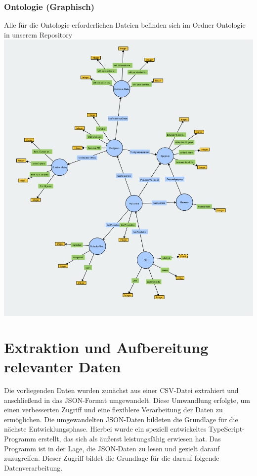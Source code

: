 \documentclass[a4paper, 12pt]{article}
\begin{document}
\subsubsection{Ontologie (Graphisch)}
Alle für die Ontologie erforderlichen Dateien befinden sich im Ordner Ontologie in unserem Repository
\newline
\includegraphics[width=\textwidth]{migration.png}
\newline \newline

\section{Extraktion und Aufbereitung relevanter Daten}
Die vorliegenden Daten wurden zunächst aus einer CSV-Datei extrahiert und anschließend in das JSON-Format umgewandelt. Diese Umwandlung erfolgte, um einen verbesserten Zugriff und eine flexiblere Verarbeitung der Daten zu ermöglichen. Die umgewandelten JSON-Daten bildeten die Grundlage für die nächste Entwicklungsphase. Hierbei wurde ein speziell entwickeltes TypeScript-Programm erstellt, das sich als äußerst leistungsfähig erwiesen hat. Das Programm ist in der Lage, die JSON-Daten zu lesen und gezielt darauf zuzugreifen. Dieser Zugriff bildet die Grundlage für die darauf folgende Datenverarbeitung.
\end{document}
